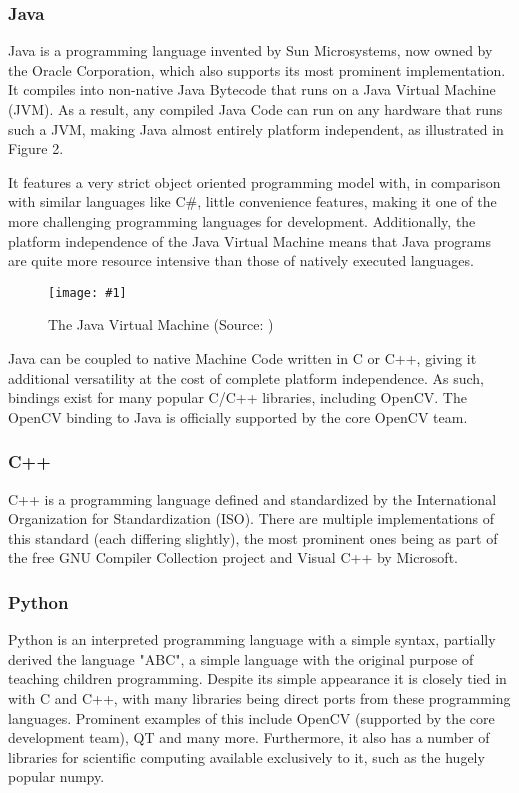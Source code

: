\documentclass[BSA,Bachelor,english]{twbook}%
\newcommand{\imgsrc}[1]{ (Source: \cite{#1})}
\newcommand{\stdgraphic}[3]{\begin{figure}[h]\caption{#2\imgsrc{#3}}\centering\texttt{[image: \#1]}\end{figure}}
\begin{document}
\subsubsection{Java}
Java\cite{JAVA} is a programming language invented by Sun Microsystems, now owned by the Oracle Corporation, which also supports its most prominent implementation. It compiles into non-native Java Bytecode that runs on a Java Virtual Machine (JVM). As a result, any compiled Java Code can run on any hardware that runs such a JVM, making Java almost entirely platform independent, as illustrated in Figure 2.

It features a very strict object oriented programming model with, in comparison with similar languages like C\#, little convenience features, making it one of the more challenging programming languages for development. Additionally, the platform independence of the Java Virtual Machine means that Java programs are quite more resource intensive than those of natively executed languages\cite{SPD_COMPARISON}.

\stdgraphic{img/java-jvm.png}{The Java Virtual Machine}{IMGJVM}
\newpage
Java can be coupled to native Machine Code written in C or C++, giving it additional versatility at the cost of complete platform independence. As such, bindings exist for many popular C/C++ libraries, including OpenCV. The OpenCV binding to Java is officially supported by the core OpenCV team.
\subsubsection{C++}
C++ is a programming language defined and standardized by the International Organization for Standardization (ISO)\cite{CPP}. There are multiple implementations of this standard (each differing slightly), the most prominent ones being as part of the free GNU Compiler Collection project and Visual C++ by Microsoft.
\subsubsection{Python}
Python\cite{PYTH} is an interpreted programming language with a simple syntax, partially derived the language "ABC", a simple language with the original purpose of teaching children programming. Despite its simple appearance it is closely tied in with C and C++, with many libraries being direct ports from these programming languages. Prominent examples of this include OpenCV (supported by the core development team), QT and many more. Furthermore, it also has a number of libraries for scientific computing available exclusively to it, such as the hugely popular numpy.
\end{document}
